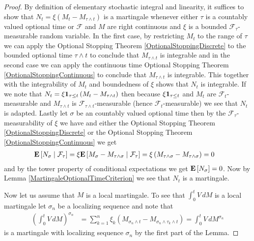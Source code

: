 \begin{proof}
By definition of elementary stochastic integral and linearity, it suffices to show that $N_t = \xi \left (M_t - M_{\tau \wedge t} \right)$ is a martingale whenever either $\tau$ is a countably valued optional time or $\mathcal{F}$ and $M$ are right continuous and $\xi$ is a bounded $\mathcal{F}_\tau$-measurable random variable.  In the first case, by restricting $M_t$ to the range of $\tau$ we can apply the Optional Stopping Theorem \ref{OptionalStoppingDiscrete} to the bounded optional time $\tau \wedge t$ to conclude that $M_{\tau \wedge t}$ is integrable and in the second case we can apply the continuous time Optional Stopping Theorem \ref{OptionalStoppingContinuous} to conclude that $M_{\tau \wedge t}$ is integrable.  This together with the integrability of $M_t$ and boundedness of $\xi$ shows that $N_t$ is integrable.  If we note that $N_t = \xi \characteristic{ \tau \leq t} \left (M_t - M_{\tau \wedge t} \right)$ then because $ \xi \characteristic{ \tau \leq t}$ and $M_t$ are $\mathcal{F}_t$-measurable and $M_{\tau \wedge t}$ is $\mathcal{F}_{\tau \wedge t}$-measurable (hence $\mathcal{F}_t$-measurable) we see that $N_t$ is adapted.  Lastly let $\sigma$ be an countably valued optional time then by the $\mathcal{F}_\tau$-measurability of $\xi$ we have and either the Optional Stopping Theorem \ref{OptionalStoppingDiscrete} or the Optional Stopping Theorem \ref{OptionalStoppingContinuous} we get
\begin{align*}
\cexpectationlong{\mathcal{F}_\tau}{N_\sigma} &= \xi \cexpectationlong{\mathcal{F}_\tau}{M_\sigma - M_{\tau \wedge \sigma}} = \xi \left(M_{\tau \wedge \sigma} - M_{\tau \wedge \sigma} \right) = 0
\end{align*}
and by the tower property of conditional expectations we get $\expectation{N_\sigma} = 0$.  Now by Lemma \ref{MartingaleOptionalTimeCriterion} we see that $N_t$ is a martingale.

Now let us assume that $M$ is a local martingale.  To see that $\int_0^t V \, dM$ is a local martingale let $\sigma_n$ be a localizing sequence and note that
\begin{align*}
\left( \int_0^t V \, dM\right)^{\sigma_n} &= \sum_{k=1}^n \xi_k \left( M_{\sigma_n \wedge t} - M_{\sigma_n \wedge\tau_k \wedge t} \right) = \int_0^t V \, dM^{\sigma_n}
\end{align*}
is a martingale with localizing sequence $\sigma_n$  by the first part of the Lemma.
\end{proof}

